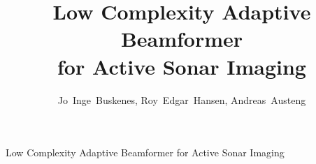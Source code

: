 \documentclass[10pt,journal,draftclsnofoot,onecolumn]{IEEEtran}
\newcommand\1{\vec 1}
\begin{document}
\title{Low Complexity Adaptive Beamformer\\ for Active Sonar Imaging}

\author{Jo~Inge~Buskenes, %
        Roy~Edgar~Hansen,%
        Andreas~Austeng%

}

%
{Low Complexity Adaptive Beamformer for Active Sonar Imaging}


\end{document}
